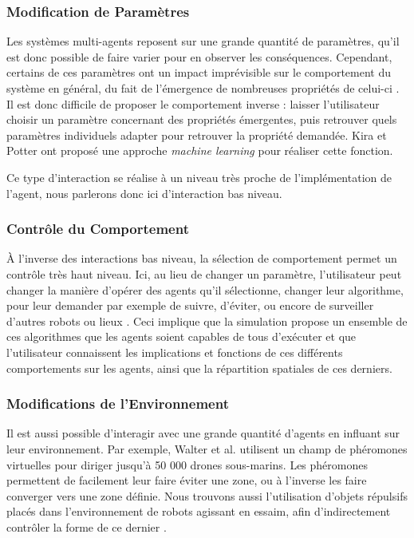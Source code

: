 		
	\subsubsection{Modification de Paramètres}
	Les systèmes multi-agents reposent sur une grande quantité de paramètres, qu'il est donc possible de faire varier pour en observer les conséquences. Cependant, certains de ces paramètres ont un impact imprévisible sur le comportement du système en général, du fait de l'émergence de nombreuses propriétés de celui-ci \cite{couzin_collective_2002}. Il est donc difficile de proposer le comportement inverse : laisser l'utilisateur choisir un paramètre concernant des propriétés émergentes, puis retrouver quels paramètres individuels adapter pour retrouver la propriété demandée. Kira et Potter \cite{kira_exerting_2009} ont proposé une approche \textit{machine learning} pour réaliser cette fonction.
	
	Ce type d'interaction se réalise à un niveau très proche de l'implémentation de l'agent, nous parlerons donc ici d'interaction bas niveau.
		
	\subsubsection{Contrôle du Comportement}
	À l'inverse des interactions bas niveau, la sélection de comportement permet un contrôle très haut niveau. Ici, au lieu de changer un paramètre, l'utilisateur peut changer la manière d'opérer des agents qu'il sélectionne, changer leur algorithme, pour leur demander par exemple de suivre, d'éviter, ou encore de surveiller d'autres robots ou lieux \cite{coppin_controlling_2012}. Ceci implique que la simulation propose un ensemble de ces algorithmes que les agents soient capables de tous d'exécuter et que l'utilisateur connaissent les implications et fonctions de ces différents comportements sur les agents, ainsi que la répartition spatiales de ces derniers.
	
		
		
	\subsubsection{Modifications de l'Environnement}
		Il est aussi possible d'interagir avec une grande quantité d'agents en influant sur leur environnement. Par exemple, Walter et al. \cite{walter_uav_2006} utilisent un champ de phéromones virtuelles pour diriger jusqu'à 50 000 drones sous-marins. Les phéromones permettent de facilement leur faire éviter une zone, ou à l'inverse les faire converger vers une zone définie. Nous trouvons aussi l'utilisation d'objets répulsifs placés dans l'environnement de robots agissant en essaim, afin d'indirectement contrôler la forme de ce dernier \cite{jung_multi-robot_2013}.	
	
